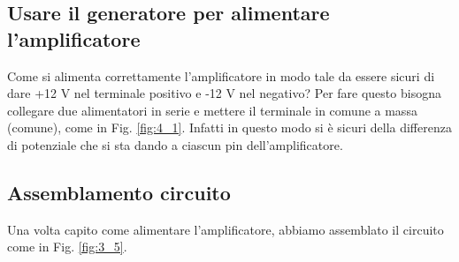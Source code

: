 \documentclass[../main/main.tex]{subfiles}
\begin{document}
\subsection{Usare il generatore per alimentare l'amplificatore}

Come si alimenta correttamente l'amplificatore in modo tale da essere sicuri di dare +12 V nel terminale positivo e -12 V nel negativo? Per fare questo bisogna collegare due alimentatori in serie e mettere il terminale in comune a massa (comune), come in Fig. \ref{fig:4_1}. Infatti in questo modo si è sicuri della differenza di potenziale che si sta dando a ciascun pin dell'amplificatore.


\subsection{Assemblamento circuito}
Una volta capito come alimentare l'amplificatore, abbiamo assemblato il circuito come in Fig. \ref{fig:3_5}.


\end{document}
